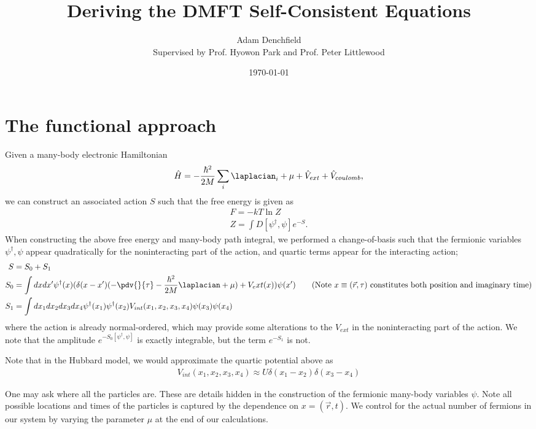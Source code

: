 \documentclass{article}
\begin{document}
\title{Deriving the DMFT Self-Consistent Equations}
\author{Adam Denchfield \\ Supervised by Prof. Hyowon Park and Prof. Peter Littlewood}
\date{\today{}}
\maketitle
\tableofcontents
\section{The functional approach}

Given a many-body electronic Hamiltonian
\begin{align*}
  \hat H = -\frac{\hbar^2}{2M}\sum_i \laplacian_i + \mu + \hat V_{ext} + \hat V_{coulomb},
\end{align*}
we can construct an associated action $S$ such that the free energy is given as
\begin{align*}
  F = -kT \ln Z \\
  Z = \int D[\psi^\dagger, \psi] e^{-S}.
\end{align*}
When constructing the above free energy and many-body path integral, we performed a change-of-basis such that the fermionic variables $\psi^\dagger, \psi$ appear quadratically for the noninteracting part of the action, and quartic terms appear for the interacting action;
\begin{align*}
  S & = S_{0} + S_1 \\
  S_0 & = \int dx dx' \psi^\dagger (x)(\delta(x-x')(-\pdv{}{\tau} - \frac{\hbar^2}{2M}\laplacian + \mu) + V_ext(x)) \psi(x') \tag{Note $x \equiv (\vec r, \tau)$ constitutes both position and imaginary time}\\
  S_1 & =\int dx_1 dx_2 dx_3 dx_4 \psi^\dagger(x_1) \psi^\dagger(x_2) V_{int}(x_1, x_2, x_3, x_4) \psi(x_3) \psi(x_4)
\end{align*}
where the action is already normal-ordered, which may provide some alterations to the $V_{ext}$ in the noninteracting part of the action. We note that the amplitude $e^{-S_0[\psi^\dagger, \psi]}$ is exactly integrable, but the term $e^{-S_1}$ is not.
\begin{remark}
  Note that in the Hubbard model, we would approximate the quartic potential above as
  \begin{align*}
    V_{int}(x_1, x_2, x_3, x_4) \approx U\delta(x_1 - x_2) \delta(x_3 - x_4)
  \end{align*}

\end{remark}
\begin{remark}
  One may ask where all the particles are. These are details hidden in the construction of the fermionic many-body variables $\psi$. Note all possible locations and times of the particles is captured by the dependence on $x=(\vec r, t)$. We control for the actual number of fermions in our system by varying the parameter $\mu$ at the end of our calculations.
\end{remark}
\end{document}
